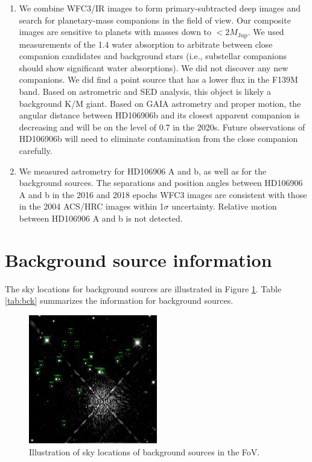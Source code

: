\documentclass[twocolumn]{aastex62}
\newcommand{\mjup}{\ensuremath{M_\mathrm{Jup}}\xspace}
\begin{document}
\begin{enumerate}
\item We combine WFC3/IR images to form primary-subtracted deep images and search for planetary-mass companions in the field of view. Our composite images are sensitive to planets with masses down to $< 2 \mjup$. We used measurements of the 1.4\micron{} water absorption to {arbitrate between close companion candidates and background stars} (i.e., substellar companions should show significant water absorptions). We did not discover  any new companions. We did find a point source that has a lower flux in the F139M band. Based on astrometric and SED analysis, this object is likely a background K/M giant.  Based on GAIA astrometry and proper motion, the angular distance between HD106906b and its closest apparent companion is decreasing and will be on the level of 0.7\arcsec{}  in the 2020s. Future observations of HD106906b will need to eliminate contamination from the close companion carefully.

\item We measured astrometry for HD106906 A and b, as well as for the background sources. The separations and position angles between HD106906 A and b in the 2016 and 2018 epochs WFC3 images are consistent with those in the 2004 ACS/HRC images within 1$\sigma$ uncertainty. Relative motion between HD106906 A and b is not detected. 
\end{enumerate}

\appendix
\section{Background source information}

The sky locations for background sources are illustrated in Figure \ref{fig:bck}. Table \ref{tab:bck} summarizes the information for background sources.

\begin{figure}[h]
  \centering
  \includegraphics[width=0.5\textwidth]{figures/backSourceLabeled.png}
  \caption{Illustration of sky locations of background sources in the FoV.}
  \label{fig:bck}
\end{figure}
\end{document}
